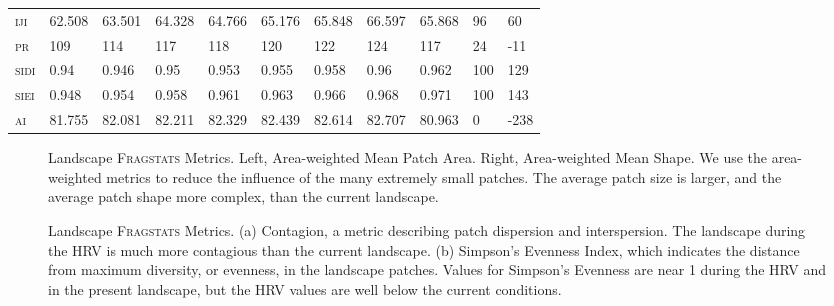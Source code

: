\begin{landscape}
\begin{table}[!htbp]
\begin{tabular}{@{}llllllll|lll@{}}
\small \textsc{iji }            & 62.508       & 63.501      & 64.328        & 64.766       & 65.176        & 65.848        & 66.597         & 65.868      & 96     & 60    \\
\small \textsc{pr}              & 109       & 114      & 117        & 118       & 120        & 122        & 124         & 117      & 24     & -11    \\
\small \textsc{sidi}            & 0.94       & 0.946      & 0.95        & 0.953       & 0.955        & 0.958        & 0.96         & 0.962      & 100     & 129    \\
\small \textsc{siei}            & 0.948       & 0.954      & 0.958        & 0.961       & 0.963        & 0.966        & 0.968         & 0.971      & 100     & 143    \\
\small \textsc{ai}              & 81.755       & 82.081      & 82.211        & 82.329       & 82.439        & 82.614        & 82.707         & 80.963      & 0     & -238     \\ \bottomrule
\end{tabular}
\end{table}
\end{landscape}


\clearpage
{}
\begin{figure}[!htbp]
  \centering
\caption{Landscape \textsc{Fragstats} Metrics. Left, Area-weighted Mean Patch Area. Right, Area-weighted Mean Shape. We use the area-weighted metrics to reduce the influence of the many extremely small patches. The average patch size is larger, and the average patch shape more complex, than the current landscape.} 
\label{fig:fragland_areashape}
\end{figure}

\begin{figure}[!htbp]
  \centering
\caption{Landscape \textsc{Fragstats} Metrics. (a) Contagion, a metric describing patch dispersion and interspersion. The landscape during the HRV is much more contagious than the current landscape. (b) Simpson's Evenness Index, which indicates the distance from maximum diversity, or evenness, in the landscape patches. Values for Simpson's Evenness are near 1 during the HRV and in the present landscape, but the HRV values are well below the current conditions.} 
\label{fig:fragland_contagsiei}
\end{figure}

